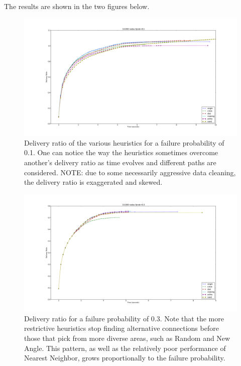 \documentclass[conference]{IEEEtran}
\begin{document}
The results are shown in the two figures below.

\newpage

\begin{figure}
\includegraphics[width=6.0in]{../../images/plots/fprob1}
\vspace{-20pt}
\caption{Delivery ratio of the various heuristics for a failure probability of 0.1.
One can notice the way the heuristics sometimes overcome another's delivery ratio as time evolves and different paths are considered.
NOTE: due to some necessarily aggressive data cleaning, the delivery ratio is exaggerated and skewed.}
\end{figure}
\begin{figure}
\includegraphics[width=6.0in]{../../images/plots/fprob3}
\vspace{-20pt}
\caption{Delivery ratio for a failure probability of 0.3.
Note that the more restrictive heuristics stop finding alternative connections before those that pick from more diverse areas, such as Random and New Angle.
This pattern, as well as the relatively poor performance of Nearest Neighbor, grows proportionally to the failure probability.}
\end{figure}
\end{document}
